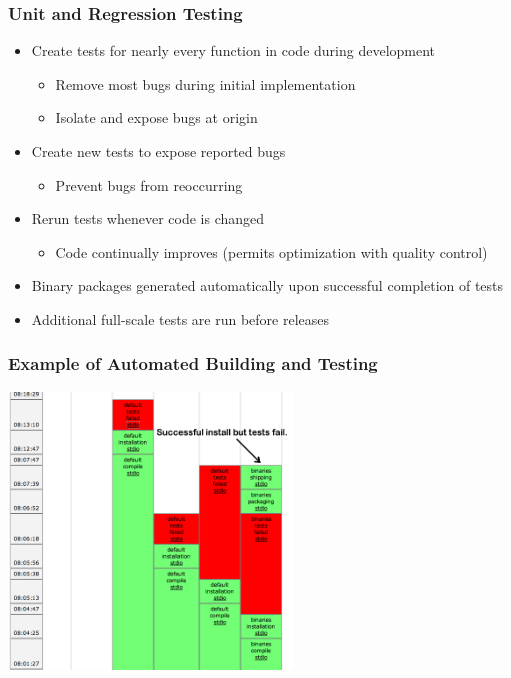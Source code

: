 \documentclass{beamer}
\begin{document}
\begin{frame}
  \frametitle{Unit and Regression Testing}

  \begin{itemize}
  \item Create tests for nearly every function in code during development
    \begin{itemize}
    \item Remove most bugs during initial implementation
    \item Isolate and expose bugs at origin
    \end{itemize}
  \item Create new tests to expose reported bugs
    \begin{itemize}
    \item Prevent bugs from reoccurring
    \end{itemize}
  \item Rerun tests whenever code is changed
    \begin{itemize}
    \item Code continually improves (permits optimization with
      quality control)
    \end{itemize}
  \item Binary packages generated automatically upon successful
    completion of tests
  \item Additional full-scale tests are run before releases
  \end{itemize}

\end{frame}

\begin{frame}
  \frametitle{Example of Automated Building and Testing}

  \begin{center}
    \includegraphics[height=2.9in]{figs/buildbotfail}
  \end{center}

\end{frame}
\end{document}
